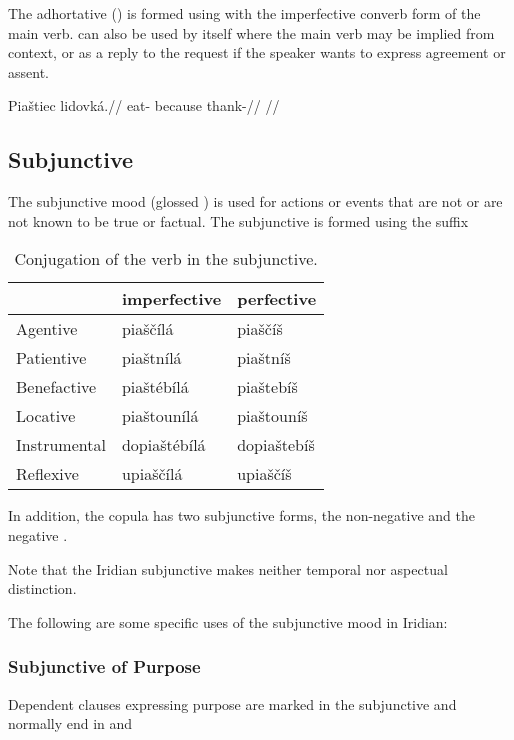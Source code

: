 The adhortative () is formed using  with the imperfective converb form of the main verb.  can also be used by itself where the main verb may be implied from context, or as a reply to the request if the speaker wants to express agreement or assent.

\pex
\begingl
\gla Piaštiec lidovká.//
\glb eat- because thank-//
\glft {}//
\endgl
\xe

\subsection{Subjunctive}

The subjunctive mood (glossed ) is used for actions or events that are not or are not known to be true or factual. The subjunctive is formed using the suffix 

\begin{table}
	\footnotesize\sffamily
	\caption{Conjugation of the verb  in the subjunctive.}
	\begin{tabu}to 0.7\textwidth{YYY}
		\toprule
		&{\sc imperfective} &{\sc perfective}\\
		\midrule
		Agentive	& piaščílá	& piaščíš\\
		Patientive	& piaštnílá		& piaštníš\\
		Benefactive	& piaštébílá		& piaštebíš\\
		Locative	& piaštounílá		& piaštouníš\\
		Instrumental& dopiaštébílá	& dopiaštebíš\\
		Reflexive	& upiaščílá	& upiaščíš\\
		\bottomrule
	\end{tabu}
\end{table}

In addition, the copula has two subjunctive forms, the non-negative  and the negative .

Note that the Iridian subjunctive makes neither temporal nor aspectual distinction.

\par The following are some specific uses of the subjunctive mood in Iridian:

\subsubsection{Subjunctive of Purpose}

Dependent clauses expressing purpose are marked in the subjunctive and normally end in  and 

